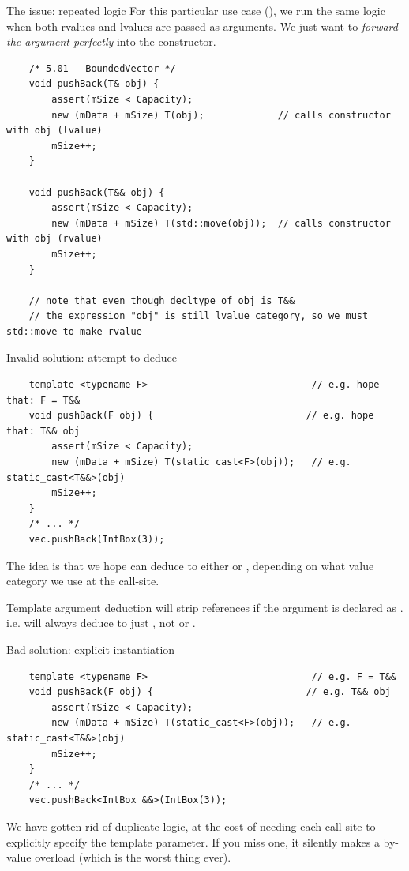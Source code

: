 \begin{frame}[fragile]{The issue: repeated logic}
  For this particular use case (), we run the same logic
  when both rvalues and lvalues are passed as arguments. 
  We just want to \emph{forward the argument perfectly} into the constructor.

  \begin{verbatim}
    /* 5.01 - BoundedVector */
    void pushBack(T& obj) {
        assert(mSize < Capacity);
        new (mData + mSize) T(obj);             // calls constructor with obj (lvalue)
        mSize++;
    }

    void pushBack(T&& obj) {
        assert(mSize < Capacity);
        new (mData + mSize) T(std::move(obj));  // calls constructor with obj (rvalue)
        mSize++;
    }

    // note that even though decltype of obj is T&&
    // the expression "obj" is still lvalue category, so we must std::move to make rvalue
  \end{verbatim}
\end{frame}

\begin{frame}[fragile]{Invalid solution: attempt to deduce }
  \begin{verbatim}
    template <typename F>                             // e.g. hope that: F = T&&
    void pushBack(F obj) {                           // e.g. hope that: T&& obj
        assert(mSize < Capacity);
        new (mData + mSize) T(static_cast<F>(obj));   // e.g. static_cast<T&&>(obj)
        mSize++;
    }
    /* ... */
    vec.pushBack(IntBox(3));
  \end{verbatim}

  The idea is that we hope  can deduce to either  or ,
  depending on what value category we use at the call-site.

  \begin{sqt:result}
    Template argument deduction will strip references if the argument is declared as .
    i.e.  will always deduce to just , not  or .
  \end{sqt:result}
\end{frame}

\begin{frame}[fragile]{Bad solution: explicit instantiation}
  \begin{verbatim}
    template <typename F>                             // e.g. F = T&&
    void pushBack(F obj) {                           // e.g. T&& obj
        assert(mSize < Capacity);
        new (mData + mSize) T(static_cast<F>(obj));   // e.g. static_cast<T&&>(obj)
        mSize++;
    }
    /* ... */
    vec.pushBack<IntBox &&>(IntBox(3));
  \end{verbatim}

  We have gotten rid of duplicate logic, at the cost of needing each call-site
  to explicitly specify the template parameter. If you miss one, it silently
  makes a by-value overload (which is the worst thing ever).  
\end{frame}

